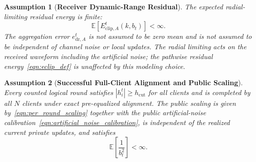 \documentclass[journal]{IEEEtran}
\newtheorem{assumption}{Assumption}
\begin{document}
\begin{assumption}[\bf Receiver Dynamic-Range Residual]
    \label{assum:dr_residual}
    The expected radial-limiting residual energy is finite:
    \begin{equation}
        \mathbb E[E_{\mathrm{clip},A}^t(k,b_t)]<\infty.
    \end{equation}
    The aggregation error $e_{\mathrm{dr},A}^t$ is not assumed to be zero mean and is not assumed to be independent of channel noise or local updates. The radial limiting acts on the received waveform including the artificial noise; the pathwise residual energy~\eqref{eqn:eclip_def} is unaffected by this modeling choice.
\end{assumption}

\begin{assumption}[\bf Successful Full-Client Alignment and Public Scaling]
    \label{assum:public_scaling}
    Every counted logical round satisfies $|h_i^t|\ge h_{\mathrm{cut}}$ for all clients and is completed by all $N$ clients under exact pre-equalized alignment. The public scaling is given by~\eqref{eqn:per_round_scaling} together with the public artificial-noise calibration~\eqref{eqn:artificial_noise_calibration}, is independent of the realized current private updates, and satisfies
    \begin{equation}
        \mathbb E\left[\frac{1}{b_t^2}\right]<\infty.
    \end{equation}
\end{assumption}
\end{document}
